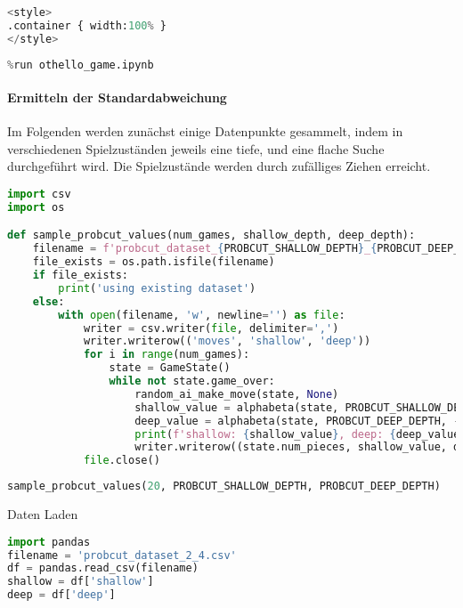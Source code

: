 \begin{lstlisting}[language=Python]
%%HTML
<style>
.container { width:100% }
</style>
\end{lstlisting}

\begin{lstlisting}[language=Python]
%run othello_ai.ipynb
%run othello_game.ipynb
\end{lstlisting}

\hypertarget{ermitteln-der-standardabweichung}{%
\paragraph{Ermitteln der
Standardabweichung}\label{ermitteln-der-standardabweichung}}

Im Folgenden werden zunächst einige Datenpunkte gesammelt, indem in
verschiedenen Spielzuständen jeweils eine tiefe, und eine flache Suche
durchgeführt wird. Die Spielzustände werden durch zufälliges Ziehen
erreicht.

\begin{lstlisting}[language=Python]
import csv
import os

def sample_probcut_values(num_games, shallow_depth, deep_depth):
    filename = f'probcut_dataset_{PROBCUT_SHALLOW_DEPTH}_{PROBCUT_DEEP_DEPTH}.csv'
    file_exists = os.path.isfile(filename)
    if file_exists:
        print('using existing dataset')
    else:
        with open(filename, 'w', newline='') as file:
            writer = csv.writer(file, delimiter=',')
            writer.writerow(('moves', 'shallow', 'deep'))
            for i in range(num_games):
                state = GameState()
                while not state.game_over:
                    random_ai_make_move(state, None)
                    shallow_value = alphabeta(state, PROBCUT_SHALLOW_DEPTH, -math.inf, math.inf, combined_heuristic)
                    deep_value = alphabeta(state, PROBCUT_DEEP_DEPTH, -math.inf, math.inf, combined_heuristic)
                    print(f'shallow: {shallow_value}, deep: {deep_value}')
                    writer.writerow((state.num_pieces, shallow_value, deep_value))
            file.close()
\end{lstlisting}

\begin{lstlisting}[language=Python]
sample_probcut_values(20, PROBCUT_SHALLOW_DEPTH, PROBCUT_DEEP_DEPTH)
\end{lstlisting}

Daten Laden

\begin{lstlisting}[language=Python]
import pandas
filename = 'probcut_dataset_2_4.csv'
df = pandas.read_csv(filename)
shallow = df['shallow']
deep = df['deep']
\end{lstlisting}


